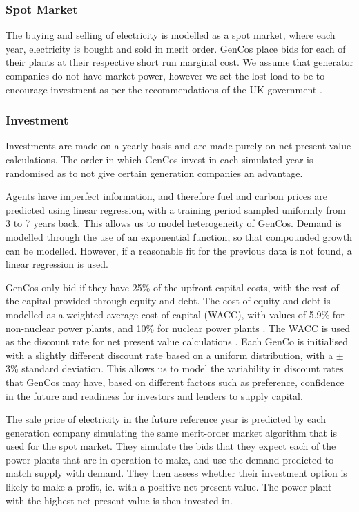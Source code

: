 \subsubsection{Spot Market}

The buying and selling of electricity is modelled as a spot market, where each year, electricity is bought and sold in merit order. GenCos place bids for each of their plants at their respective short run marginal cost. We assume that generator companies do not have market power, however we set the lost load to be  to encourage investment as per the recommendations of the UK government \cite{DECC2013}.

\subsubsection{Investment}

Investments are made on a yearly basis and are made purely on net present value calculations. The order in which GenCos invest in each simulated year is randomised as to not give certain generation companies an advantage.

Agents have imperfect information, and therefore fuel and carbon prices are predicted using linear regression, with a training period sampled uniformly from 3 to 7 years back. This allows us to model heterogeneity of GenCos. Demand is modelled through the use of an exponential function, so that compounded growth can be modelled. However, if a reasonable fit for the previous data is not found, a linear regression is used.

GenCos only bid if they have 25\% of the upfront capital costs, with the rest of the capital provided through equity and debt. The cost of equity and debt is modelled as a weighted average cost of capital (WACC), with values of 5.9\% for non-nuclear power plants, and 10\% for nuclear power plants \cite{KPMG2017, Paper2012}. The WACC is used as the discount rate for net present value calculations \cite{KincheloeStephenC1990TWAC}. Each GenCo is initialised with a slightly different discount rate based on a uniform distribution, with a $\pm$3\% standard deviation. This allows us to model the variability in discount rates that GenCos may have, based on different factors such as preference, confidence in the future and readiness for investors and lenders to supply capital.

The sale price of electricity in the future reference year is predicted by each generation company simulating the same merit-order market algorithm that is used for the spot market. They simulate the bids that they expect each of the power plants that are in operation to make, and use the demand predicted to match supply with demand. They then assess whether their investment option is likely to make a profit, ie. with a positive net present value. The power plant with the highest net present value is then invested in. 


